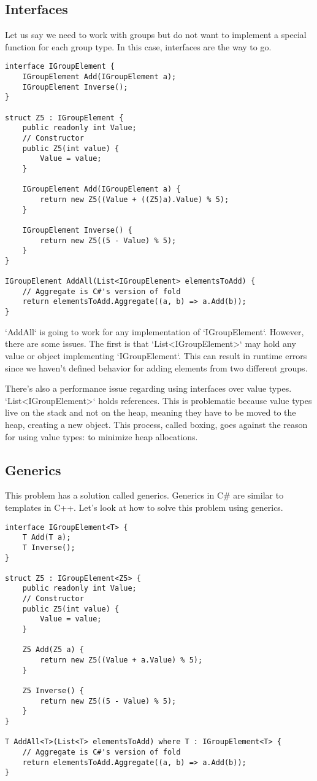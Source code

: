 \subsection{Interfaces}

Let us say we need to work with groups but do not want to implement a special function for each group type. In this case, interfaces are the way to go.

\begin{lstlisting}
interface IGroupElement {
    IGroupElement Add(IGroupElement a);
    IGroupElement Inverse();
}

struct Z5 : IGroupElement {
    public readonly int Value;
    // Constructor
    public Z5(int value) {
        Value = value;
    }

    IGroupElement Add(IGroupElement a) {
        return new Z5((Value + ((Z5)a).Value) % 5);
    }

    IGroupElement Inverse() {
        return new Z5((5 - Value) % 5);
    }
}

IGroupElement AddAll(List<IGroupElement> elementsToAdd) {
    // Aggregate is C#'s version of fold
    return elementsToAdd.Aggregate((a, b) => a.Add(b));
}
\end{lstlisting}

`AddAll` is going to work for any implementation of `IGroupElement`. However, there are some issues. The first is that `List<IGroupElement>` may hold any value or object implementing `IGroupElement`. This can result in runtime errors since we haven't defined behavior for adding elements from two different groups.

There's also a performance issue regarding using interfaces over value types. `List<IGroupElement>` holds references. This is problematic because value types live on the stack and not on the heap, meaning they have to be moved to the heap, creating a new object. This process, called boxing, goes against the reason for using value types: to minimize heap allocations.

\subsection{Generics}
This problem has a solution called generics. Generics in C\# are similar to templates in C++. Let's look at how to solve this problem using generics.

\begin{lstlisting}
interface IGroupElement<T> {
    T Add(T a);
    T Inverse();
}

struct Z5 : IGroupElement<Z5> {
    public readonly int Value;
    // Constructor
    public Z5(int value) {
        Value = value;
    }

    Z5 Add(Z5 a) {
        return new Z5((Value + a.Value) % 5);
    }

    Z5 Inverse() {
        return new Z5((5 - Value) % 5);
    }
}

T AddAll<T>(List<T> elementsToAdd) where T : IGroupElement<T> {
    // Aggregate is C#'s version of fold
    return elementsToAdd.Aggregate((a, b) => a.Add(b));
}
\end{lstlisting}


